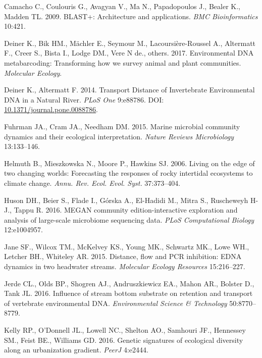\documentclass[fleqn,10pt,lineno]{wlpeerj} %
\begin{document}
\hypertarget{ref-camacho2009blast}{}
Camacho C., Coulouris G., Avagyan V., Ma N., Papadopoulos J., Bealer K.,
Madden TL. 2009. BLAST+: Architecture and applications. \emph{BMC
Bioinformatics} 10:421.

\hypertarget{ref-deiner2017environmental}{}
Deiner K., Bik HM., Mächler E., Seymour M., Lacoursière-Roussel A.,
Altermatt F., Creer S., Bista I., Lodge DM., Vere N de., others. 2017.
Environmental DNA metabarcoding: Transforming how we survey animal and
plant communities. \emph{Molecular Ecology}.

\hypertarget{ref-deiner_transport_2014-1}{}
Deiner K., Altermatt F. 2014. Transport Distance of Invertebrate
Environmental DNA in a Natural River. \emph{PLoS One} 9:e88786. DOI:
\href{https://doi.org/10.1371/journal.pone.0088786}{10.1371/journal.pone.0088786}.

\hypertarget{ref-fuhrman2015marine}{}
Fuhrman JA., Cram JA., Needham DM. 2015. Marine microbial community
dynamics and their ecological interpretation. \emph{Nature Reviews
Microbiology} 13:133--146.

\hypertarget{ref-helmuth2006living}{}
Helmuth B., Mieszkowska N., Moore P., Hawkins SJ. 2006. Living on the
edge of two changing worlds: Forecasting the responses of rocky
intertidal ecosystems to climate change. \emph{Annu. Rev. Ecol. Evol.
Syst.} 37:373--404.

\hypertarget{ref-huson2016megan}{}
Huson DH., Beier S., Flade I., Górska A., El-Hadidi M., Mitra S.,
Ruscheweyh H-J., Tappu R. 2016. MEGAN community edition-interactive
exploration and analysis of large-scale microbiome sequencing data.
\emph{PLoS Computational Biology} 12:e1004957.

\hypertarget{ref-jane2015distance}{}
Jane SF., Wilcox TM., McKelvey KS., Young MK., Schwartz MK., Lowe WH.,
Letcher BH., Whiteley AR. 2015. Distance, flow and PCR inhibition: EDNA
dynamics in two headwater streams. \emph{Molecular Ecology Resources}
15:216--227.

\hypertarget{ref-jerde2016influence}{}
Jerde CL., Olds BP., Shogren AJ., Andruszkiewicz EA., Mahon AR., Bolster
D., Tank JL. 2016. Influence of stream bottom substrate on retention and
transport of vertebrate environmental DNA. \emph{Environmental Science
\& Technology} 50:8770--8779.

\hypertarget{ref-kelly2016genetic}{}
Kelly RP., O'Donnell JL., Lowell NC., Shelton AO., Samhouri JF.,
Hennessey SM., Feist BE., Williams GD. 2016. Genetic signatures of
ecological diversity along an urbanization gradient. \emph{PeerJ}
4:e2444.
\end{document}
